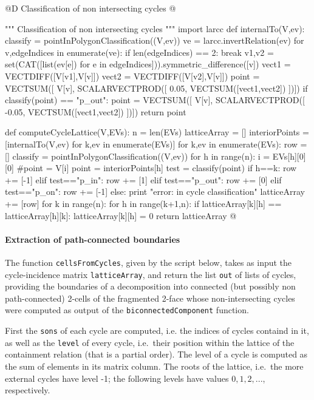\documentclass[11pt,oneside]{article}    %
\begin{document}
@D Classification of non intersecting cycles
@{""" Classification of non intersecting cycles """
import larcc
def internalTo(V,ev):
    classify = pointInPolygonClassification((V,ev))
    ve = larcc.invertRelation(ev)
    for v,edgeIndices in enumerate(ve):
        if len(edgeIndices) == 2: break
    v1,v2 = set(CAT([list(ev[e]) for e in edgeIndices])).symmetric_difference([v])
    vect1 = VECTDIFF([V[v1],V[v]])
    vect2 = VECTDIFF([V[v2],V[v]])
    point = VECTSUM([ V[v], SCALARVECTPROD([ 0.05, VECTSUM([vect1,vect2]) ])])
    if classify(point) == "p_out":
        point = VECTSUM([ V[v], SCALARVECTPROD([ -0.05, VECTSUM([vect1,vect2]) ])])
    return point
    
def computeCycleLattice(V,EVs):
    n = len(EVs)
    latticeArray = []
    interiorPoints = [internalTo(V,ev) for k,ev in enumerate(EVs)]
    for k,ev in enumerate(EVs):
        row = []
        classify = pointInPolygonClassification((V,ev))
        for h in range(n):
            i = EVs[h][0][0]
            #point = V[i]
            point = interiorPoints[h]
            test = classify(point)
            if h==k: row += [-1]
            elif test=="p_in": row += [1]
            elif test=="p_out": row += [0]
            elif test=="p_on": row += [-1]
            else: print "error: in cycle classification"
        latticeArray += [row]
    for k in range(n):
        for h in range(k+1,n): 
            if latticeArray[k][h] == latticeArray[h][k]:
                latticeArray[k][h] = 0
    return latticeArray
@}

\paragraph{Extraction of path-connected boundaries}

The function \texttt{cellsFromCycles}, given by the script below, takes as input the cycle-incidence matrix \texttt{latticeArray}, and return the list \texttt{out} of lists of cycles, providing the boundaries of a decomposition into connected (but possibly non path-connected) 2-cells of the fragmented 2-face whose non-intersecting cycles were computed as output of the \texttt{biconnectedComponent} function. 

First the \texttt{sons} of each cycle are computed, i.e. the indices of cycles containd in it, as well as the \texttt{level} of every cycle, i.e.~their position within the lattice of the containment relation (that is a partial order). 
The level of a cycle is computed as the sum of elements in its matrix column. The roots of the lattice, i.e.~the more external cycles have level -1; the following levels have values $0,1,2,...$, respectively.
\end{document}
